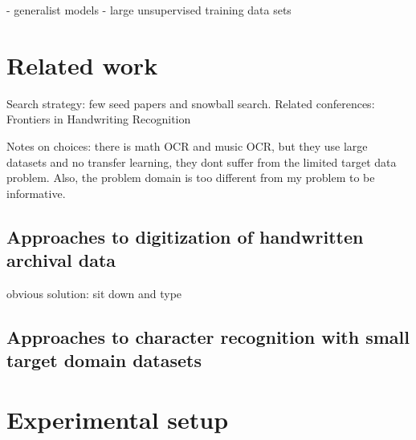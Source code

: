\documentclass{article}
\begin{document}
- generalist models
	- large unsupervised training data sets


\section{Related work}


Search strategy: few seed papers and snowball search. Related conferences: 
Frontiers in Handwriting Recognition

Notes on choices: there is math OCR and music OCR, but they use large datasets and no transfer learning, they dont suffer from the limited target data problem. Also, the problem domain is too different from my problem to be informative.

\subsection{Approaches to digitization of handwritten archival data}

obvious solution: sit down and type

\subsection{Approaches to character recognition with small target domain datasets}

\section{Experimental setup}
\end{document}
